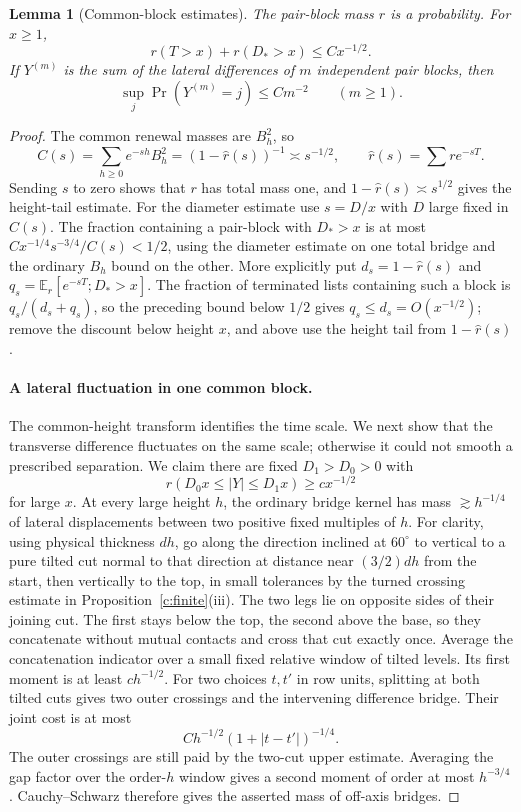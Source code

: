 \documentclass[11pt]{article}
\numberwithin{equation}{section}
\newtheorem{lemma}[theorem]{Lemma}
\theoremstyle{definition}\newtheorem{definition}[theorem]{Definition}
\theoremstyle{remark}\newtheorem{remark}[theorem]{Remark}
\begin{document}
\begin{lemma}[Common-block estimates]\label{c:pair-block-estimates}
The pair-block mass $r$ is a probability. For $x\ge1$,
\[
 r(T>x)+r(D_*>x)\le Cx^{-1/2}.
\]
If $Y^{(m)}$ is the sum of the lateral differences of $m$ independent
pair blocks, then
\[
 \sup_j\Pr(Y^{(m)}=j)\le Cm^{-2}\qquad(m\ge1).
\]
\end{lemma}
\begin{proof}
The common renewal masses are $B_h^2$, so
\[
 C(s)=\sum_{h\ge0}e^{-s h}B_h^2=(1-\hat r(s))^{-1}\asymp s^{-1/2},\qquad
 \hat r(s)=\sum r e^{-sT}.
\]
Sending $s$ to zero shows that $r$ has total mass one, and
$1-\hat r(s)\asymp s^{1/2}$ gives the height-tail estimate.
For the diameter estimate use \(s=D/x\) with \(D\) large fixed in \(C(s)\). The fraction containing a pair-block with \(D_*>x\) is at most \(C x^{-1/4}s^{-3/4}/C(s)<1/2\), using the diameter estimate on one total bridge and the ordinary \(B_h\) bound on the other. More explicitly put $d_s=1-\hat r(s)$ and $q_s=\mathbb E_r[e^{-sT};D_*>x]$. The fraction of terminated lists containing such a block is $q_s/(d_s+q_s)$, so the preceding bound below $1/2$ gives $q_s\le d_s=O(x^{-1/2})$; remove the discount below height \(x\), and above use the height tail from \(1-\hat r(s)\).



\paragraph{A lateral fluctuation in one common block.}
The common-height transform identifies the time scale. We next show that
the transverse difference fluctuates on the same scale; otherwise it
could not smooth a prescribed separation. We claim there are fixed \(D_1>D_0>0\) with
\[
 r(D_0 x\le |Y|\le D_1 x)\ge c x^{-1/2}
\]
for large \(x\). At every large height \(h\), the ordinary bridge kernel has mass \(\gtrsim h^{-1/4}\) of lateral displacements between two positive fixed multiples of \(h\). For clarity, using physical thickness \(d h\), go along the direction inclined at \(60^\circ\) to vertical to a pure tilted cut normal to that direction at distance near \((3/2)d h\) from the start, then vertically to the top, in small tolerances by the turned crossing estimate in Proposition~\ref{c:finite}(iii). The two legs lie on opposite sides of their joining cut. The first stays below the top, the second above the base, so they concatenate without mutual contacts and cross that cut exactly once. Average the concatenation indicator over a small fixed relative window of tilted levels. Its first moment is at least $ch^{-1/2}$. For two choices $t,t'$ in row units, splitting at both tilted cuts gives two outer crossings and the intervening difference bridge. Their joint cost is at most
\[
 Ch^{-1/2}(1+|t-t'|)^{-1/4}.
\]
The outer crossings are still paid by the two-cut upper estimate.
Averaging the gap factor over the order-$h$ window gives a second moment
of order at most $h^{-3/4}$. Cauchy--Schwarz therefore gives the asserted
mass of off-axis bridges.




\end{proof}
\end{document}
